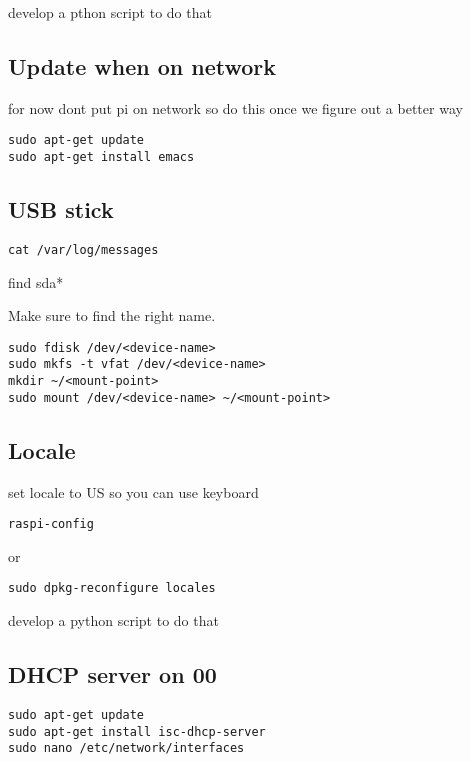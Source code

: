develop a pthon script to do that

\subsection{Update when on network}

for now dont put pi on network so do this once we figure out a better
way

\begin{lstlisting}
sudo apt-get update
sudo apt-get install emacs
\end{lstlisting}

\subsection{USB stick}

\begin{lstlisting}
cat /var/log/messages
\end{lstlisting}

find sda*

Make sure to find the right name.

\begin{lstlisting}
sudo fdisk /dev/<device-name>
sudo mkfs -t vfat /dev/<device-name>
mkdir ~/<mount-point>
sudo mount /dev/<device-name> ~/<mount-point>
\end{lstlisting}

\subsection{Locale}

set locale to US so you can use keyboard

\begin{lstlisting}
raspi-config 
\end{lstlisting}

or

\begin{lstlisting}
sudo dpkg-reconfigure locales
\end{lstlisting}

develop a python script to do that

\subsection{DHCP server on 00}

\begin{lstlisting}
sudo apt-get update
sudo apt-get install isc-dhcp-server
sudo nano /etc/network/interfaces
\end{lstlisting}


